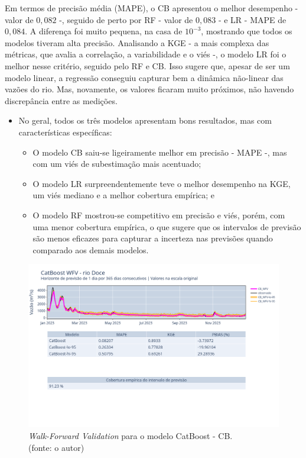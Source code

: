 Em termos de precisão média (MAPE), o CB apresentou o melhor desempenho - valor de $0,082$ -, seguido de perto por RF - valor de $0,083$ - e LR - MAPE de $0,084$. A diferença foi muito pequena, na casa de $10^{-3}$, mostrando que todos os modelos tiveram alta precisão. Analisando a KGE - a mais complexa das métricas, que avalia a correlação, a variabilidade e o viés -, o modelo LR foi o melhor nesse critério, seguido pelo RF e CB. Isso sugere que, apesar de ser um modelo linear, a regressão conseguiu capturar bem a dinâmica não-linear das vazões do rio. Mas, novamente, os valores ficaram muito próximos, não havendo discrepância entre as medições.

\begin{itemize}
	\item No geral, todos os três modelos apresentam bons resultados, mas com características específicas:
	\begin{itemize}
		\item O modelo CB saiu-se ligeiramente melhor em precisão - MAPE -, mas com um viés de subestimação mais acentuado;
		\item O modelo LR surpreendentemente teve o melhor desempenho na KGE, um viés mediano e a melhor cobertura empírica; e
		\item O modelo RF mostrou-se competitivo em precisão e viés, porém, com uma menor cobertura empírica, o que sugere que os intervalos de previsão são menos eficazes para capturar a incerteza nas previsões quando comparado aos demais modelos.
	\end{itemize}
\end{itemize}

\begin{figure}[!h]
	\centering
	\includegraphics[scale=0.33]{Figuras/rio_doce/wfv/CB/CB_WFV_ORIG.png}
	\caption{\textit{Walk-Forward Validation} para o modelo CatBoost - CB.\\(fonte: o autor)}
	\label{fig:doce_CB_WFV_ORIG}
\end{figure}


